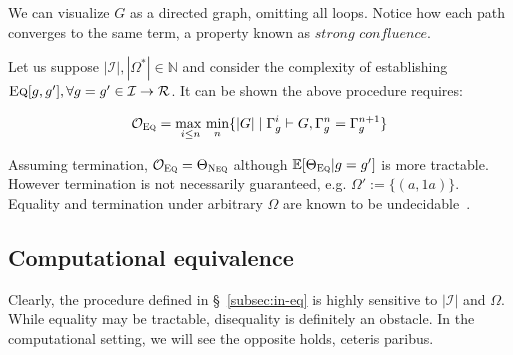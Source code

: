 \documentclass[11pt]{article}
\begin{document}
    \noindent We can visualize $G$ as a directed graph, omitting all loops. Notice how each path converges to the same term, a property known as $\textit{strong confluence}$.

    \hspace{12pt}

    \noindent Let us suppose $|\mathcal{I}|, |\Omega^*| \in \mathbb{N}$ and consider the complexity of establishing $\textsc{Eq}[g, g'], \forall g = g' \in \mathcal{I} \rightarrow \mathcal{R}$. It can be shown the above procedure requires:

    $$\mathcal{O}_{\textsc{Eq}} = \underset{i \leq n}{\text{max }}\underset{n}{\text{min}}\{|G| \mid \Gamma^i_g \vdash G, \Gamma_g^n = \Gamma_g^{n+1}\}$$ %

    \noindent Assuming termination, $\mathcal{O}_{\textsc{Eq}} = \Theta_{\textsc{Neq}}$ although $\mathbb{E}[\Theta_\textsc{Eq}|g = g']$ is more tractable. However termination is not necessarily guaranteed, e.g. $\Omega' := \{(a, 1a)\}$. Equality and termination under arbitrary $\Omega$ are known to be undecidable~\citep{baader1999term}.

    \subsection{Computational equivalence}\label{subsec:comp-eq}

    Clearly, the procedure defined in \S~\ref{subsec:in-eq} is highly sensitive to $|\mathcal{I}|$ and $\Omega$. While equality may be tractable, disequality is definitely an obstacle. In the computational setting, we will see the opposite holds, ceteris paribus. %
\end{document}
